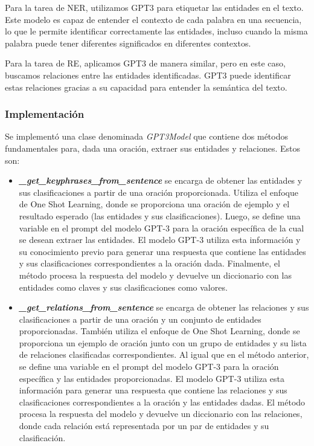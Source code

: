 \documentclass[10pt]{article} %
\begin{document}
	Para la tarea de NER, utilizamos GPT3 para etiquetar las entidades en el texto. Este modelo es capaz de entender el contexto de cada palabra en una secuencia, lo que le permite identificar correctamente las entidades, incluso cuando la misma palabra puede tener diferentes significados en diferentes contextos.
	
	Para la tarea de RE, aplicamos GPT3 de manera similar, pero en este caso, buscamos relaciones entre las entidades identificadas. GPT3 puede identificar estas relaciones gracias a su capacidad para entender la semántica del texto.
	
	\subsubsection{Implementaci\'on}
	
	Se implement\'o una clase denominada \textit{GPT3Model} que contiene dos m\'etodos fundamentales para, dada una oraci\'on, extraer sus entidades y relaciones. Estos son:
	\begin{itemize}
		\item  \textbf{\textit{\_get\_keyphrases\_from\_sentence}} se encarga de obtener las entidades y sus clasificaciones a partir de una oración proporcionada. Utiliza el enfoque de One Shot Learning, donde se proporciona una oración de ejemplo y el resultado esperado (las entidades y sus clasificaciones). Luego, se define una variable en el prompt del modelo GPT-3 para la oración específica de la cual se desean extraer las entidades. El modelo GPT-3 utiliza esta información y su conocimiento previo para generar una respuesta que contiene las entidades y sus clasificaciones correspondientes a la oración dada. Finalmente, el método procesa la respuesta del modelo y devuelve un diccionario con las entidades como claves y sus clasificaciones como valores.
		\item  \textbf{\textit{\_get\_relations\_from\_sentence}} se encarga de obtener las relaciones y sus clasificaciones a partir de una oración y un conjunto de entidades proporcionadas. También utiliza el enfoque de One Shot Learning, donde se proporciona un ejemplo de oración junto con un grupo de entidades y su lista de relaciones clasificadas correspondientes. Al igual que en el método anterior, se define una variable en el prompt del modelo GPT-3 para la oración específica y las entidades proporcionadas. El modelo GPT-3 utiliza esta información para generar una respuesta que contiene las relaciones y sus clasificaciones correspondientes a la oración y las entidades dadas. El método procesa la respuesta del modelo y devuelve un diccionario con las relaciones, donde cada relación está representada por un par de entidades y su clasificación.
	\end{itemize}
		
\end{document}
